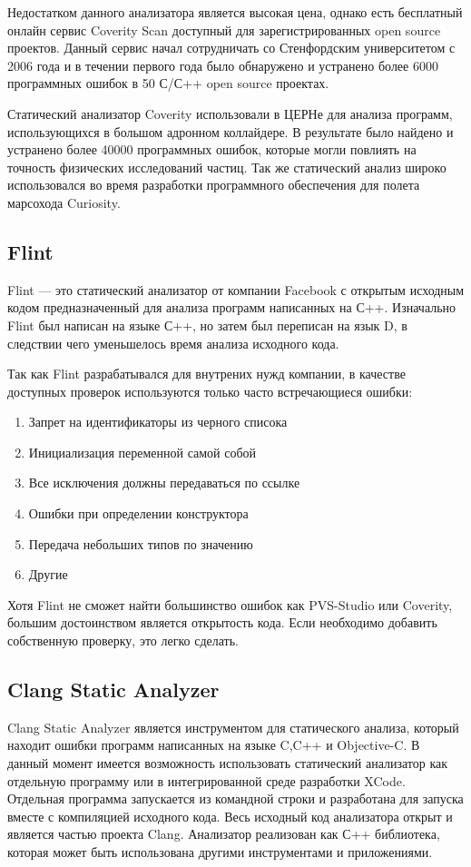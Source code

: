 Недостатком данного анализатора является высокая цена, однако есть бесплатный онлайн сервис
Coverity Scan доступный для зарегистрированных open source проектов. Данный сервис начал сотрудничать
со Стенфордским университетом с 2006 года и в течении первого года было обнаружено и устранено
более 6000 программных ошибок в 50 С/С++ open source проектах\cite{covScan}. 

Статический анализатор Coverity использовали в ЦЕРНе для анализа программ, использующихся в 
большом адронном коллайдере\cite{covCern}. В результате было найдено и устранено более 40000 программных 
ошибок, которые могли повлиять на точность физических исследований частиц. Так же статический анализ
широко использовался во время разработки программного обеспечения для полета марсохода Curiosity\cite{covCur}.   
 
\subsection{Flint}
Flint --- это статический анализатор от компании Facebook с открытым исходным кодом\cite{flintGit} предназначенный 
для анализа программ написанных на С++. Изначально Flint был написан на языке С++, но затем 
был переписан на язык D, в следствии чего уменьшелось время анализа исходного кода. 

Так как Flint разрабатывался для внутрених нужд компании, в качестве доступных проверок используются 
только часто встречающиеся ошибки:
\begin{enumerate}
	\item Запрет на идентификаторы из черного списока
	\item Инициализация переменной самой собой
	\item Все исключения должны передаваться по ссылке
	\item Ошибки при определении конструктора
	\item Передача небольших типов по значению
	\item Другие\cite{flintErr}
\end{enumerate}

Хотя Flint не сможет найти большинство ошибок как PVS-Studio или Coverity, большим достоинством
является открытость кода. Если необходимо добавить собственную проверку, это легко сделать.
  
\subsection{Clang Static Analyzer}
Clang Static Analyzer является инструментом для статического анализа, который находит ошибки
программ написанных на языке C,C++ и Objective-C. В данный момент имеется возможность использовать 
статический анализатор как отдельную программу или в интегрированной среде разработки XCode.
Отдельная программа запускается из командной строки и разработана для запуска вместе с компиляцией
исходного кода. Весь исходный код анализатора открыт и является частью проекта Clang. 
Анализатор реализован как С++ библиотека, которая может быть использована другими инструментами и приложениями.
 
